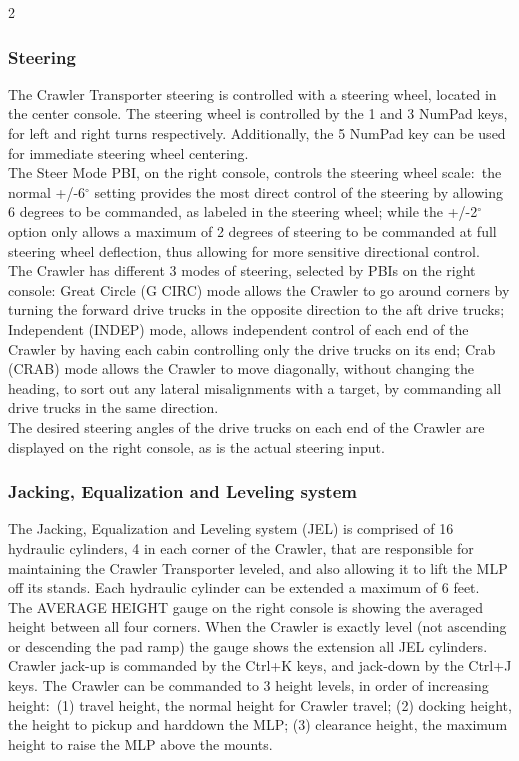 \documentclass[Space_Shuttle_Vessel_Manual.tex]{subfiles}
\begin{document}
\begin{multicols*}{2}
\subsubsection{Steering}
The Crawler Transporter steering is controlled with a steering wheel, located in the center console. The steering wheel is controlled by the 1 and 3 NumPad keys, for left and right turns respectively. Additionally, the 5 NumPad key can be used for immediate steering wheel centering.\\
The Steer Mode PBI, on the right console, controls the steering wheel scale$\colon$ the normal +/-6$^\circ$ setting provides the most direct control of the steering by allowing 6 degrees to be commanded, as labeled in the steering wheel; while the +/-2$^\circ$ option only allows a maximum of 2 degrees of steering to be commanded at full steering wheel deflection, thus allowing for more sensitive directional control.\\
The Crawler has different 3 modes of steering, selected by PBIs on the right console: Great Circle (G CIRC) mode allows the Crawler to go around corners by turning the forward drive trucks in the opposite direction to the aft drive trucks; Independent (INDEP) mode, allows independent control of each end of the Crawler by having each cabin controlling only the drive trucks on its end; Crab (CRAB) mode allows the Crawler to move diagonally, without changing the heading, to sort out any lateral misalignments with a target, by commanding all drive trucks in the same direction.\\
The desired steering angles of the drive trucks on each end of the Crawler are displayed on the right console, as is the actual steering input.


\subsubsection{Jacking, Equalization and Leveling system}
The Jacking, Equalization and Leveling system (JEL) is comprised of 16 hydraulic cylinders, 4 in each corner of the Crawler, that are responsible for maintaining the Crawler Transporter leveled, and also allowing it to lift the MLP off its stands. Each hydraulic cylinder can be extended a maximum of 6 feet.\\
The AVERAGE HEIGHT gauge on the right console is showing the averaged height between all four corners. When the Crawler is exactly level (not ascending or descending the pad ramp) the gauge shows the extension all JEL cylinders.\\
Crawler jack-up is commanded by the Ctrl+K keys, and jack-down by the Ctrl+J keys. The Crawler can be commanded to 3 height levels, in order of increasing height$\colon$ (1) travel height, the normal height for Crawler travel; (2) docking height, the height to pickup and harddown the MLP; (3) clearance height, the maximum height to raise the MLP above the mounts.



\end{multicols*}
\end{document}
